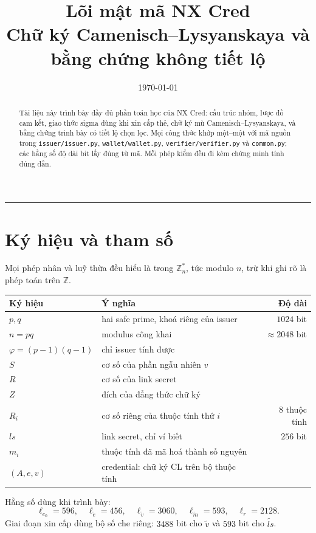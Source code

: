 \documentclass[a4paper,11pt]{article}
\title{\sffamily\bfseries Lõi mật mã NX Cred\\[6pt]
\large\mdseries Chữ ký Camenisch--Lysyanskaya và bằng chứng không tiết lộ}
\author{}
\date{\small\color{muted}\today}
\theoremstyle{definition}
\theoremstyle{plain}
\theoremstyle{remark}
\newcommand{\Zn}{\mathbb{Z}_n^{*}}
\begin{document}
\maketitle

\begin{abstract}
\noindent Tài liệu này trình bày đầy đủ phần toán học của NX Cred: cấu trúc nhóm, lược đồ
cam kết, giao thức sigma dùng khi xin cấp thẻ, chữ ký mù Camenisch--Lysyanskaya, và bằng
chứng trình bày có tiết lộ chọn lọc. Mọi công thức khớp một--một với mã nguồn trong
\texttt{issuer/issuer.py}, \texttt{wallet/wallet.py}, \texttt{verifier/verifier.py} và
\texttt{common.py}; các hằng số độ dài bit lấy đúng từ mã. Mỗi phép kiểm đều đi kèm chứng
minh tính đúng đắn.
\end{abstract}

\tableofcontents
\bigskip\hrule\bigskip

\section{Ký hiệu và tham số}

Mọi phép nhân và luỹ thừa đều hiểu là trong $\Zn$, tức modulo $n$, trừ khi ghi rõ là phép
toán trên $\mathbb{Z}$.

\begin{center}
\begin{tabular}{@{}llr@{}}
\toprule
\textbf{Ký hiệu} & \textbf{Ý nghĩa} & \textbf{Độ dài} \\
\midrule
$p,q$ & hai safe prime, khoá riêng của issuer & $1024$ bit \\
$n=pq$ & modulus công khai & $\approx 2048$ bit \\
$\varphi=(p-1)(q-1)$ & chỉ issuer tính được & \\
$S$ & cơ số của phần ngẫu nhiên $v$ & \\
$R$ & cơ số của link secret & \\
$Z$ & đích của đẳng thức chữ ký & \\
$R_i$ & cơ số riêng của thuộc tính thứ $i$ & $8$ thuộc tính \\
$\mathit{ls}$ & link secret, chỉ ví biết & $256$ bit \\
$m_i$ & thuộc tính đã mã hoá thành số nguyên & \\
$(A,e,v)$ & credential: chữ ký CL trên bộ thuộc tính & \\
\bottomrule
\end{tabular}
\end{center}

\noindent Hằng số dùng khi trình bày:
\[
\ell_{e_0}=596,\quad
\ell_{\tilde e}=456,\quad
\ell_{\tilde v}=3060,\quad
\ell_{\tilde m}=593,\quad
\ell_r=2128 .
\]
Giai đoạn xin cấp dùng bộ số che riêng: $3488$ bit cho $\tilde v$ và $593$ bit cho
$\widetilde{\mathit{ls}}$.
\end{document}

